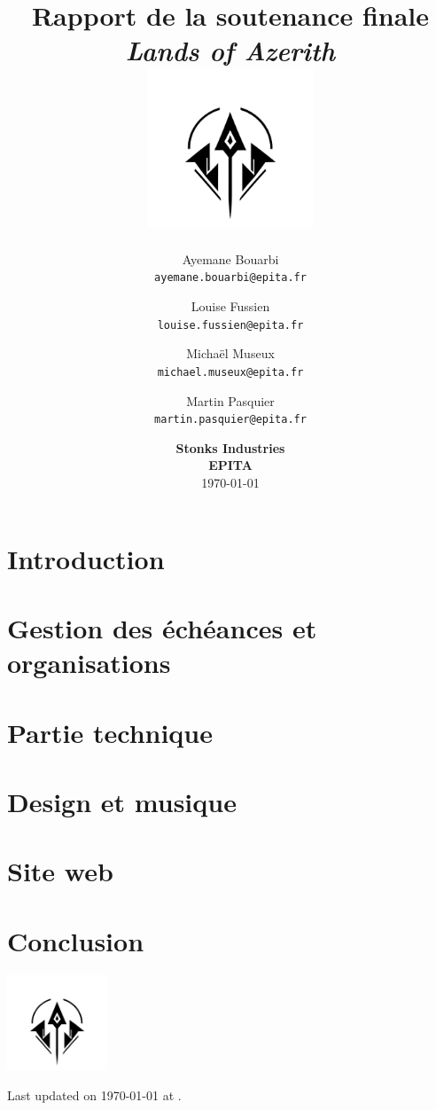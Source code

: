 \documentclass[12pt]{article}
\title{
    Rapport de la soutenance finale \\
    \textbf{\textit{Lands of Azerith}} \\
    \vspace{0.5cm}
    \includegraphics[width=5cm]{assets/logo.png}
    \vspace{3.7cm}
}
\author{
    Ayemane Bouarbi \\
    \texttt{ayemane.bouarbi@epita.fr}
    \vspace{0.5cm}\and
    Louise Fussien \\
    \texttt{louise.fussien@epita.fr}
    \vspace{0.5cm}\and
    Michaël Museux \\
    \texttt{michael.museux@epita.fr}
    \vspace{0.5cm}\and
    Martin Pasquier \\
    \texttt{martin.pasquier@epita.fr}
}
\date{
    \vspace{1.5cm}
    \textbf{Stonks Industries} \\
    \vspace{0.3cm}
    \textbf{EPITA} \\
    \vspace{1.3cm}
    \today
}
\begin{document}
\begin{titlepage}
    \maketitle
    \thispagestyle{empty} %
\end{titlepage}

\newpage
\thispagestyle{empty}
\mbox{}

\newpage
\tableofcontents

\newpage
\section{Introduction}


\newpage
\section{Gestion des échéances et organisations}


\newpage
\section{Partie technique}


\newpage
\section{Design et musique}


\newpage
\section{Site web}


\newpage
\section{Conclusion}




\centering
\vspace*{1.8cm}
\includegraphics[width=3cm]{assets/logo.png}

\vspace*{1cm}
Last updated on \today{} at \currenttime.
\end{document}
